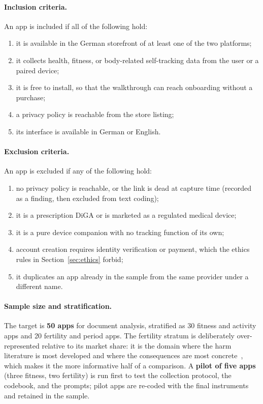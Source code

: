 \paragraph{Inclusion criteria.} An app is included if all of the following hold:
\begin{enumerate}[leftmargin=*,itemsep=1pt]
  \item it is available in the German storefront of at least one of the two
        platforms;
  \item it collects health, fitness, or body-related self-tracking data from the
        user or a paired device;
  \item it is free to install, so that the walkthrough can reach onboarding
        without a purchase;
  \item a privacy policy is reachable from the store listing;
  \item its interface is available in German or English.
\end{enumerate}

\paragraph{Exclusion criteria.} An app is excluded if any of the following hold:
\begin{enumerate}[leftmargin=*,itemsep=1pt]
  \item no privacy policy is reachable, or the link is dead at capture time
        (recorded as a finding, then excluded from text coding);
  \item it is a prescription DiGA or is marketed as a regulated medical device;
  \item it is a pure device companion with no tracking function of its own;
  \item account creation requires identity verification or payment, which the
        ethics rules in Section~\ref{sec:ethics} forbid;
  \item it duplicates an app already in the sample from the same provider under
        a different name.
\end{enumerate}

\paragraph{Sample size and stratification.}
The target is \textbf{50 apps} for document analysis, stratified as 30 fitness
and activity apps and 20 fertility and period apps. The fertility stratum is
deliberately over-represented relative to its market share: it is the domain
where the harm literature is most developed and where the consequences are most
concrete~\parencite{cao2024deleted,malki2024exploring,shipp2020period}, which
makes it the more informative half of a comparison. A \textbf{pilot of five
apps} (three fitness, two fertility) is run first to test the collection
protocol, the codebook, and the prompts; pilot apps are re-coded with the final
instruments and retained in the sample.

